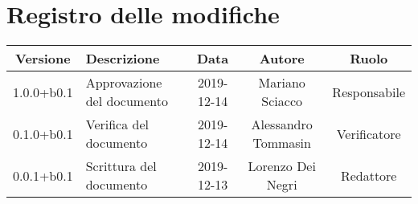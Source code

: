 \section*{Registro delle modifiche}

\begin{center}
	\begin{longtable}{|c|p{3cm}|c|c|c|}
	\hline
	\rowcolor{lighter-grayer}
	\textbf{Versione} & \textbf{Descrizione} & \textbf{Data} & \textbf{Autore} & \textbf{Ruolo} \\
	\hline
	\endfirsthead



	1.0.0+b0.1 & Approvazione del documento & 2019-12-14 & Mariano Sciacco & Responsabile \\
	\hline
	0.1.0+b0.1 & Verifica del documento & 2019-12-14 & Alessandro Tommasin & Verificatore \\
	\hline
	0.0.1+b0.1 & Scrittura del documento & 2019-12-13 & Lorenzo Dei Negri & Redattore \\
	\hline

	\end{longtable}
\end{center}